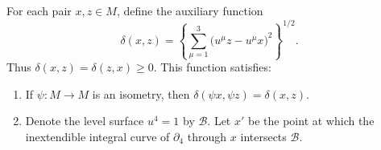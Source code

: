 For each pair $x, z \in M$, define the auxiliary function
$$
\delta(x, z) = \left\{ \sum_{\mu=1}^{3} \big( u^\mu z - u^\mu x \big)^2 \right\}^{1/2}.
$$
Thus $\delta(x, z) = \delta(z, x) \geq 0$. This function satisfies:
\begin{enumerate}
  \item[(a)] If $\psi: M \to M$ is an isometry, then $\delta(\psi x, \psi z) = \delta(x, z)$.
  \item[(b)] Denote the level surface $u^4 = 1$ by $\mathcal{B}$. Let $x'$ be the point at which the inextendible integral curve of $\partial_4$ through $x$ intersects $\mathcal{B}$.
\end{enumerate}

